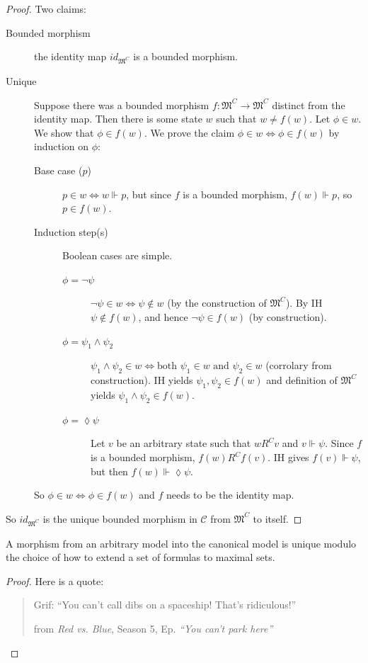 \begin{proof} Two claims:
\begin{description}
\item[Bounded morphism] the identity map $id_{\mathfrak M^C}$ is a bounded morphism.
\item[Unique] Suppose there was a bounded morphism $f : \mathfrak M^C \to \mathfrak M^C$ distinct from the identity map. Then there is some state $w$ such that $w \neq f(w)$. Let $\phi \in w$. We show that $\phi \in f(w)$. We prove the claim $\phi \in w \Leftrightarrow \phi \in f(w)$ by induction on $\phi$:
\begin{description}
\item[Base case ($p$)] $p \in w \Leftrightarrow w \Vdash p$, but since $f$ is a bounded morphism, $f(w) \Vdash p$, so $p \in f(w)$.
\item[Induction step(s)] Boolean cases are simple.
\begin{description}
\item[$\phi = \neg \psi$] $\neg \psi \in w \Leftrightarrow \psi \notin w$ (by the construction of $\mathfrak M^C$). By IH $\psi \notin f(w)$, and hence $\neg \psi \in f(w)$ (by construction).
\item[$\phi = \psi_1 \wedge \psi_2$] $\psi_1 \wedge \psi_2 \in w \Leftrightarrow \text{both } \psi_1 \in w \text{ and } \psi_2 \in w$ (corrolary from construction). IH yields $\psi_1,\psi_2 \in f(w)$ and definition of $\mathfrak M^C$ yields $\psi_1 \wedge \psi_2 \in f(w)$.
\item[$\phi = \lozenge \psi$] Let $v$ be an arbitrary state such that $wR^Cv$ and $v \Vdash \psi$. Since $f$ is a bounded morphism, $f(w)R^Cf(v)$. IH gives $f(v) \Vdash \psi$, but then $f(w)\Vdash \lozenge \psi$.
\end{description}
\end{description}
So $\phi \in w \Leftrightarrow \phi \in f(w)$ and $f$ needs to be the identity map.
\end{description}
So $id_{\mathfrak M^C}$ is the unique bounded morphism in $\mathcal C$ from $\mathfrak M^C$ to itself.
\end{proof}

A morphism from an arbitrary model into the canonical model is unique modulo the choice of how to extend a set of formulas to maximal sets.
\begin{proof} Here is a quote:
\begin{quote}
Grif: ``You can't call dibs on a spaceship! That's ridiculous!''
\begin{flushright}
from \textit{Red vs. Blue}, Season 5, Ep. \textit{``You can't park here''}
\end{flushright}
\end{quote}
\end{proof}

